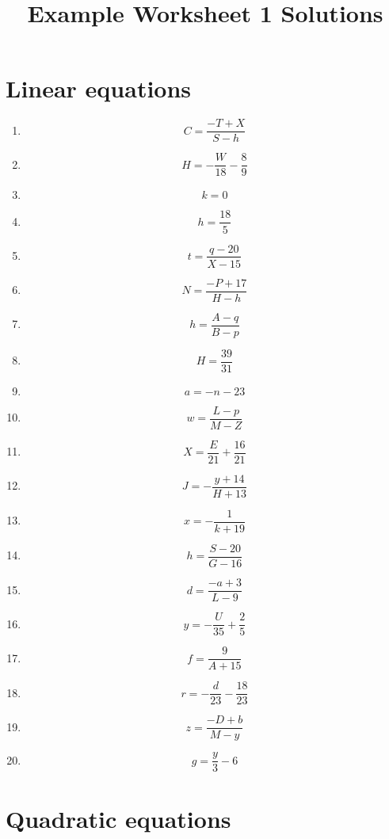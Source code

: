 \documentclass{article}
\begin{document}
    \title{Example Worksheet 1 Solutions} 
 \date{\vspace{-5ex}} 
 \maketitle

        \section{Linear equations}
        
        \begin{enumerate}
        \item$$C =\frac{- T + X}{S - h}$$
\item$$H =- \frac{W}{18} - \frac{8}{9}$$
\item$$k =0$$
\item$$h =\frac{18}{5}$$
\item$$t =\frac{q - 20}{X - 15}$$
\item$$N =\frac{- P + 17}{H - h}$$
\item$$h =\frac{A - q}{B - p}$$
\item$$H =\frac{39}{31}$$
\item$$a =- n - 23$$
\item$$w =\frac{L - p}{M - Z}$$
\item$$X =\frac{E}{21} + \frac{16}{21}$$
\item$$J =- \frac{y + 14}{H + 13}$$
\item$$x =- \frac{1}{k + 19}$$
\item$$h =\frac{S - 20}{G - 16}$$
\item$$d =\frac{- a + 3}{L - 9}$$
\item$$y =- \frac{U}{35} + \frac{2}{5}$$
\item$$f =\frac{9}{A + 15}$$
\item$$r =- \frac{d}{23} - \frac{18}{23}$$
\item$$z =\frac{- D + b}{M - y}$$
\item$$g =\frac{y}{3} - 6$$
        \end{enumerate}
        

        \section{Quadratic equations}
        
\end{document}
